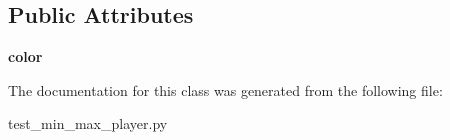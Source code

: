 \subsection*{Public Attributes}
\begin{DoxyCompactItemize}
\item 
\hypertarget{class_tabuleiro_othello-fork_1_1models_1_1players_1_1test__min__max__player_1_1_minmax_player_a40c43f9438e764e990cc15ef4eddff26}{}{\bfseries color}\label{class_tabuleiro_othello-fork_1_1models_1_1players_1_1test__min__max__player_1_1_minmax_player_a40c43f9438e764e990cc15ef4eddff26}

\end{DoxyCompactItemize}


The documentation for this class was generated from the following file\+:\begin{DoxyCompactItemize}
\item 
test\+\_\+min\+\_\+max\+\_\+player.\+py\end{DoxyCompactItemize}
